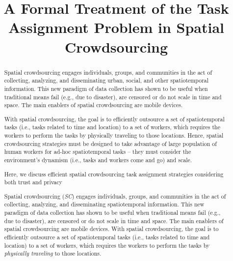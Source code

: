 \documentclass{sig-alternate}
\title{A Formal Treatment of the Task Assignment Problem in Spatial Crowdsourcing}
\begin{document}

\maketitle
\begin{abstract}
Spatial crowdsourcing engages individuals, groups, and communities in the act of collecting, analyzing, and disseminating urban, social, and other spatiotemporal information. This new paradigm of data collection has shown to be useful when traditional means fail (e.g., due to disaster), are censored or do not scale in time and space.  The main enablers of spatial crowdsourcing are mobile devices. 

With spatial crowdsourcing, the goal is to efficiently outsource a set of spatiotemporal tasks (i.e., tasks related to time and location) to a set of workers, which requires the workers to perform the tasks by physically traveling to those locations.  Hence, spatial crowdsourcing strategies must be designed to take advantage of large population of human workers for ad-hoc spatiotemporal tasks -- they must consider the environment's dynamism (i.e., tasks and workers come and go) and scale.

Here, we discuss efficient spatial crowdsourcing task assignment strategies considering both trust and privacy

Spatial crowdsourcing (\textit{SC}) engages individuals, groups, and communities in the act of collecting, analyzing, and disseminating spatiotemporal information. This new paradigm of data collection has shown to be useful when traditional means fail (e.g., due to disaster), are censored or do not scale in time and space. The main enablers of spatial crowdsourcing are mobile devices. With spatial crowdsourcing, the goal is to efficiently outsource a set of spatiotemporal tasks (i.e., tasks related to time and location) to a set of workers, which requires the workers to perform the tasks by \textit{physically traveling} to those locations.


\end{abstract}
\end{document}
